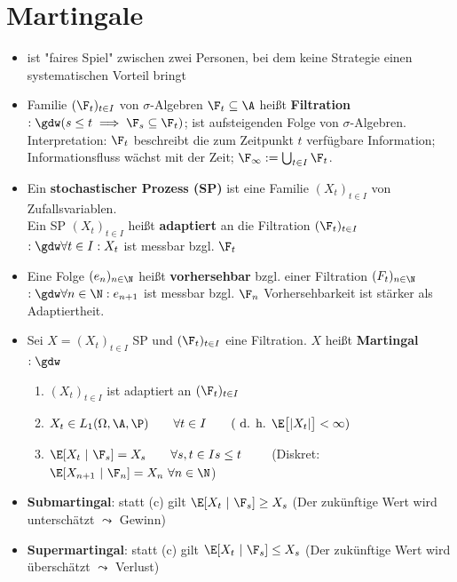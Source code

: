	\section{Martingale}
	\begin{itemize}
		\item ist "faires Spiel" zwischen zwei Personen, bei dem keine Strategie einen systematischen Vorteil bringt
		\item Familie $(\F_t)_{t\in I}$ von $\sigma$-Algebren $\F_t\subseteq\A$ heißt \textbf{Filtration} 
		$:\gdw( s\leq t\implies\F_s\subseteq\F_t)$; 
		ist aufsteigenden Folge von $\sigma$-Algebren.
		Interpretation: $\F_t$ beschreibt die zum Zeitpunkt $t$ verfügbare Information;
		Informationsfluss wächst mit der Zeit;
		$\F_\infty:=\bigcup_{t\in I}\F_t$.
		\item Ein \textbf{stochastischer Prozess (SP)} ist eine Familie $(X_t)_{t\in I}$ von Zufallsvariablen.\\
		Ein SP $(X_t)_{t\in I}$ heißt \textbf{adaptiert} an die Filtration $(\F_t)_{t\in I}$
		$:\gdw\forall t\in I: X_t$ ist messbar bzgl. $\F_t$
		\item Eine Folge $(e_n)_{n\in\N}$ heißt \textbf{vorhersehbar} bzgl. einer Filtration $(F_t)_{n\in\N}$
		$:\gdw\forall n\in\N:e_{n+1}$ ist messbar bzgl. $\F_n$
		Vorhersehbarkeit ist stärker als Adaptiertheit.
		\item Sei $X=(X_t)_{t\in I}$ SP und $(\F_t)_{t\in I}$ eine Filtration.
		$X$ heißt \textbf{Martingal} $:\gdw$
		\begin{enumerate}[label=(\alph*)]
			\item $(X_t)_{t\in I}$ ist adaptiert an $(\F_t)_{t\in I}$
			\item $\begin{aligned}
				X_t\in L_1(\Omega,\A,\P) \qquad \forall t\in I\qquad(\text{ d. h. } \E\big[|X_t|\big]<\infty)
			\end{aligned}$
			\item $\begin{aligned}
				\E[X_t~|~\F_s]=X_s\qquad\forall s,t\in I\mit s\leq t
			\end{aligned}\qquad$
			(Diskret:
		$ \E[X_{n+1}~|~\F_n]=X_n~\forall n\in\N$) 
		\end{enumerate}
		\item \textbf{Submartingal}: statt (c) gilt $\E[X_t~|~\F_s]\geq X_s$ (Der zukünftige Wert wird unterschätzt $\leadsto$ Gewinn)
		\item \textbf{Supermartingal}: statt (c) gilt $\E[X_t~|~\F_s]\leq X_s$ (Der zukünftige Wert wird überschätzt $\leadsto$ Verlust)

\end{itemize}
